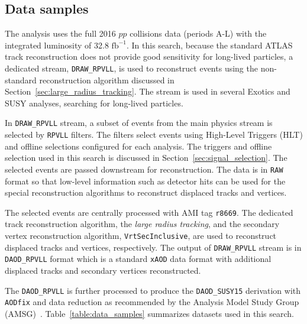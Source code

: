 \subsection{Data samples}
\label{sec:data_sample}

The analysis uses the full 2016 $pp$ collisions data (periods A-L) with the integrated luminosity of 32.8 $\mathrm{fb^{-1}}$. In this search, because the standard ATLAS track reconstruction does not provide good sensitivity for long-lived particles, a dedicated stream, \texttt{DRAW\_RPVLL}, is used to reconstruct events using the non-standard reconstruction algorithm discussed in Section~\ref{sec:large_radius_tracking}. The stream is used in several Exotics and SUSY analyses, searching for long-lived particles. %

In \texttt{DRAW\_RPVLL} stream, a subset of events from the main physics stream is selected by \texttt{RPVLL} filters. The filters select events using High-Level Triggers (HLT) and offline selections configured for each analysis. The triggers and offline selection used in this search is discussed in Section~\ref{sec:signal_selection}. The selected events are passed downstream for reconstruction. The data is in \texttt{RAW} format so that low-level information such as detector hits can be used for the special reconstruction algorithms to reconstruct displaced tracks and vertices.

The selected events are centrally processed with AMI tag \texttt{r8669}. The dedicated track reconstruction algorithm, the \textit{large radius tracking}, and the secondary vertex reconstruction algorithm, \texttt{VrtSecInclusive}, are used to reconstruct displaced tracks and vertices, respectively. The output of \texttt{DRAW\_RPVLL} stream is in \texttt{DAOD\_RPVLL} format which is a standard \texttt{xAOD} data format with additional displaced tracks and secondary vertices reconstructed. 

The \texttt{DAOD\_RPVLL} is further processed to produce the \texttt{DAOD\_SUSY15} derivation with \texttt{AODfix} and data reduction as recommended by the Analysis Model Study Group (AMSG)~\cite{Catmore:1543445}. Table~\ref{table:data_samples} summarizes datasets used in this search.

